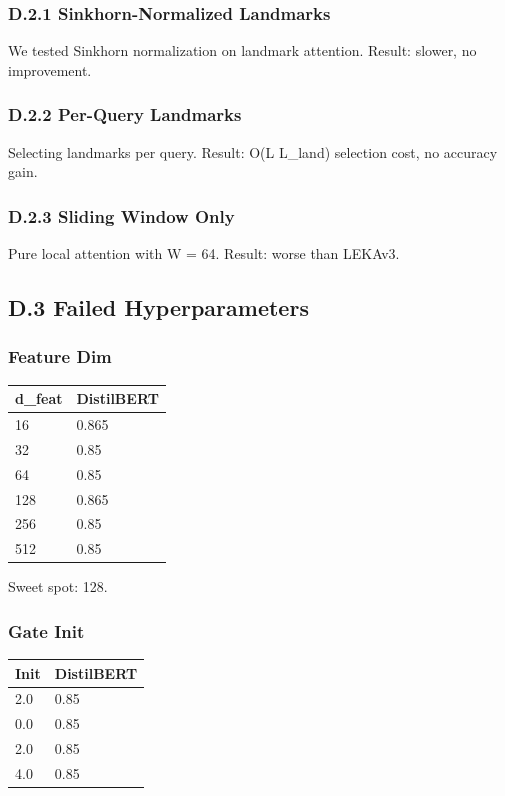 \subsubsection{D.2.1 Sinkhorn-Normalized Landmarks}

We tested Sinkhorn normalization on landmark attention. Result: slower, 
no improvement.

\subsubsection{D.2.2 Per-Query Landmarks}

Selecting landmarks per query. Result: O(L L\_land) selection cost, no 
accuracy gain.

\subsubsection{D.2.3 Sliding Window Only}

Pure local attention with W = 64. Result: worse than LEKAv3.

\subsection{D.3 Failed Hyperparameters}

\subsubsection{Feature Dim}

\begin{table}[H]
\centering
\small
\begin{tabular}{ll}
\toprule
\textbf{d\_feat} & \textbf{DistilBERT} \\
\midrule
16 & 0.865 \\
32 & 0.85 \\
64 & 0.85 \\
128 & 0.865 \\
256 & 0.85 \\
512 & 0.85 \\
\bottomrule
\end{tabular}
\end{table}

Sweet spot: 128.

\subsubsection{Gate Init}

\begin{table}[H]
\centering
\small
\begin{tabular}{ll}
\toprule
\textbf{Init} & \textbf{DistilBERT} \\
\midrule
2.0 & 0.85 \\
0.0 & 0.85 \\
2.0 & 0.85 \\
4.0 & 0.85 \\
\bottomrule
\end{tabular}
\end{table}

